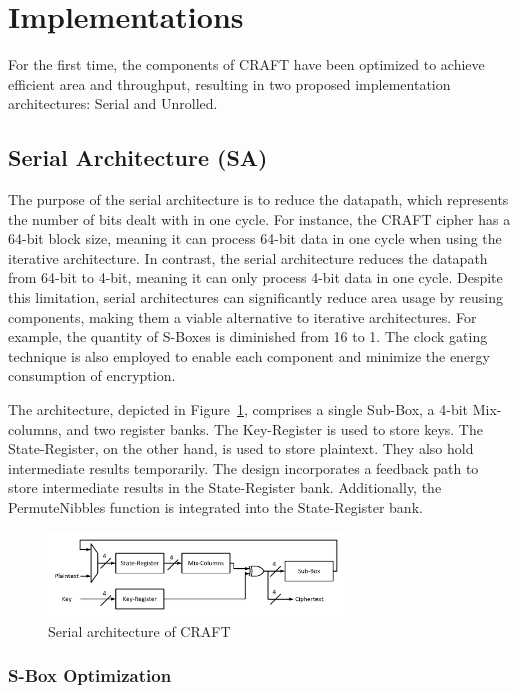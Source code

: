 \documentclass[final,5p,times,twocolumn]{elsarticle}
\begin{document}
\section{Implementations}\label{sec3}

For the first time, the components of CRAFT have been optimized to achieve efficient area and throughput, resulting in two proposed implementation architectures: Serial and Unrolled.


\subsection{Serial Architecture (SA)}\label{subsec2}
The purpose of the serial architecture is to reduce the datapath, which represents the number of bits dealt with in one cycle. For instance, the CRAFT cipher has a 64-bit block size, meaning it can process 64-bit data in one cycle when using the iterative architecture. In contrast, the serial architecture reduces the datapath from 64-bit to 4-bit, meaning it can only process 4-bit data in one cycle. Despite this limitation, serial architectures can significantly reduce area usage by reusing components, making them a viable alternative to iterative architectures.
For example, the quantity of S-Boxes is diminished from 16 to 1.
The clock gating technique is also employed to enable each component and minimize the energy consumption of encryption.

The architecture, depicted in Figure~\ref{fig3}, comprises a single Sub-Box, a 4-bit Mix-columns, and two register banks.
The Key-Register is used to store keys. The State-Register, on the other hand, is used to store plaintext.
They also hold intermediate results temporarily.
The design incorporates a feedback path to store intermediate results in the State-Register bank.
Additionally, the PermuteNibbles function is integrated into the State-Register bank.


\begin{figure}[h]%
    \centering
    \includegraphics[width=0.7\textwidth]{./fig/serial-archticture.pdf}
    \caption{Serial architecture of CRAFT}\label{fig3}
\end{figure}


\subsubsection{S-Box Optimization }\label{subsubsec1}
\end{document}
